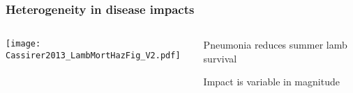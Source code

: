 \documentclass[fleqn,xcolor=table]{beamer}
\begin{document}
\begin{frame}
	\frametitle{\color{darkred} Heterogeneity in disease impacts}
	\begin{columns}[t]
		\vspace{.05in}

	\texttt{[image: Cassirer2013\_LambMortHazFig\_V2.pdf]}
	\newline
	\vspace{.1in}

	{\footnotesize \color{darkred}{Hypothesis: Variation explained by
	incomplete exposure}}
			\begin{minipage}[t][.8\textheight][t]{\linewidth}
				\vspace{.4in}

			\begin{itemize}
				{\footnotesize
				\item {\color{navy} \scriptsize Pneumonia
					reduces summer lamb survival}
				\vspace{.1in}
				\item {\color{navy} \scriptsize Impact is
					variable in magnitude} 
				}
			\end{itemize}
		\end{minipage}
	\end{columns}
\end{frame}
%
%
%			
\end{document}
